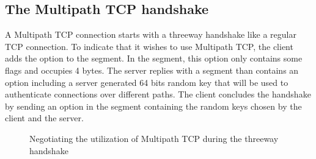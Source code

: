 \documentclass[letterpaper,10pt,english]{sphinxmanual}
\begin{document}
\subsection{The Multipath TCP handshake}
\label{\detokenize{mptcp:the-multipath-tcp-handshake}}\label{\detokenize{mptcp:mptcp-initial-mptcp-handshake}}
\sphinxAtStartPar
A Multipath TCP connection starts with a three\sphinxhyphen{}way handshake like a regular TCP connection. To indicate that it wishes to use Multipath TCP, the client adds the  option to the  segment. In the  segment, this option only contains some flags and occupies 4 bytes. The server replies with a  segment than contains an  option including a server generated 64 bits random key that will be used to authenticate connections over different paths. The client concludes the handshake by sending an  option in the  segment containing the random keys chosen by the client and the server.
\begin{figure}[htbp]\centering\capstart{}\caption{Negotiating the utilization of Multipath TCP during the three\sphinxhyphen{}way handshake}\label{\detokenize{mptcp:id63}}\label{\detokenize{mptcp:fig-tcp-handshake-mptcp}}\end{figure}
\end{document}
